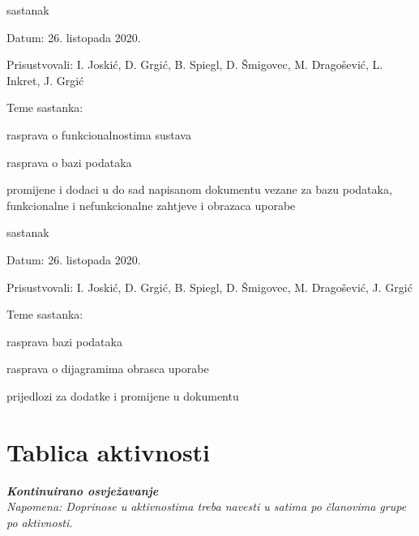 \begin{packed_enum}
	\item  sastanak
	\item[] \begin{packed_item}
		\item Datum: 26. listopada 2020.
		\item Prisustvovali: I. Joskić, D. Grgić, B. Spiegl, D. Šmigovec, M. Dragošević, L. Inkret, J. Grgić
		\item Teme sastanka:
		\begin{packed_item}
			\item  rasprava o funkcionalnostima sustava
			\item  rasprava o bazi podataka
			\item  promijene i dodaci u do sad napisanom dokumentu vezane za bazu podataka, funkcionalne i nefunkcionalne zahtjeve i obrazaca uporabe
		\end{packed_item}
	\end{packed_item}

	\item  sastanak
	\item[] \begin{packed_item}
		\item Datum: 26. listopada 2020.
		\item Prisustvovali: I. Joskić, D. Grgić, B. Spiegl, D. Šmigovec, M. Dragošević, J. Grgić
		\item Teme sastanka:
		\begin{packed_item}
			\item  rasprava bazi podataka
			\item  rasprava o dijagramima obrasca uporabe
			\item  prijedlozi za dodatke i promijene u dokumentu
		\end{packed_item}
	\end{packed_item}
	
	
\end{packed_enum}

\eject
\section*{Tablica aktivnosti}

\textbf{\textit{Kontinuirano osvježavanje}}\\

\textit{Napomena: Doprinose u aktivnostima treba navesti u satima po članovima grupe po aktivnosti.}



